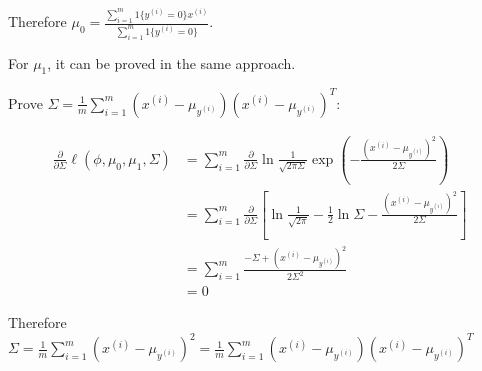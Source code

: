 \begin{answer}
	Therefore $\mu_{0} = \frac{\sum_{i=1}^m 1\{y^{(i)} = {0}\} x^{(i)}}{\sum_{i=1}^m 1\{y^{(i)} = {0}\}}$.
	
	For $\mu_1$, it can be proved in the same approach.
	
	Prove $\Sigma = \frac{1}{m} \sum_{i=1}^m (x^{(i)} - \mu_{y^{(i)}}) (x^{(i)} - \mu_{y^{(i)}})^T$:
	
	$$
	\begin{aligned}
		\frac{\partial}{\partial\Sigma} \ell(\phi, \mu_0, \mu_1, \Sigma) & = \sum_{i = 1}^m \frac{\partial}{\partial\Sigma} \ln\frac{1}{\sqrt{2\pi\Sigma}} \exp\left(-\frac{(x^{(i)} - \mu_{y^{(i)}})^2}{2\Sigma}\right)\\
		& = \sum_{i = 1}^m \frac{\partial}{\partial\Sigma} \left[\ln\frac{1}{\sqrt{2\pi}} - \frac{1}{2}\ln\Sigma - \frac{(x^{(i)} - \mu_{y^{(i)}})^2}{2\Sigma} \right]\\
		& = \sum_{i = 1}^m \frac{-\Sigma + (x^{(i)} - \mu_{y^{(i)}})^2}{2\Sigma^2}\\
		& = 0
	\end{aligned}
	$$
	
	Therefore $\Sigma = \frac{1}{m} \sum_{i=1}^m (x^{(i)} - \mu_{y^{(i)}})^2 = \frac{1}{m} \sum_{i=1}^m (x^{(i)} - \mu_{y^{(i)}}) (x^{(i)} - \mu_{y^{(i)}})^T$
	
\end{answer}